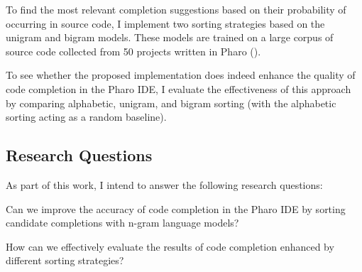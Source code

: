 To find the most relevant completion suggestions based on their probability of occurring in source code, I implement two sorting strategies based on the unigram and bigram models. These models are trained on a large corpus of source code collected from 50 projects written in Pharo (\cite{Zait20a}).

To see whether the proposed implementation does indeed enhance the quality of code completion in the Pharo IDE, I evaluate the effectiveness of this approach by comparing alphabetic, unigram, and bigram sorting (with the alphabetic sorting acting as a random baseline).

\subsection{Research Questions}
As part of this work, I intend to answer the following research questions:
\begin{RQ}
    \item Can we improve the accuracy of code completion in the Pharo IDE by sorting candidate completions with n-gram language models?
    \item How can we effectively evaluate the results of code completion enhanced by different sorting strategies?
\end{RQ}

